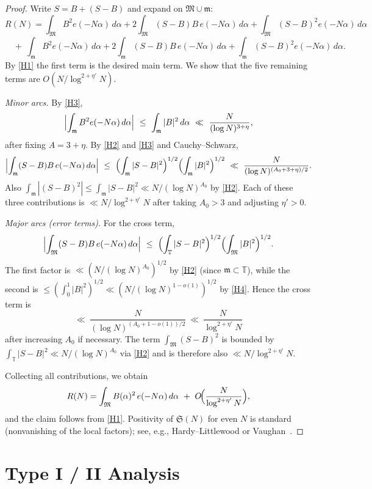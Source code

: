 \documentclass[11pt]{article}
\theoremstyle{definition}
\theoremstyle{remark}
\numberwithin{equation}{part}
\begin{document}
\begin{proof}
	Write $S=B+(S-B)$ and expand on $\mathfrak M\cup\mathfrak m$:
	\[
		R(N)=\int_{\mathfrak M} B^2 e(-N\alpha)\,d\alpha
		+ 2\!\int_{\mathfrak M} (S-B)B\,e(-N\alpha)\,d\alpha
		+ \int_{\mathfrak M} (S-B)^2 e(-N\alpha)\,d\alpha
	\]
	\[
		\quad +\ \int_{\mathfrak m} B^2 e(-N\alpha)\,d\alpha
		+ 2\!\int_{\mathfrak m} (S-B)B\,e(-N\alpha)\,d\alpha
		+ \int_{\mathfrak m} (S-B)^2 e(-N\alpha)\,d\alpha.
	\]
	By \ref{H1} the first term is the desired main term. We show that the five remaining terms are $O(N/\log^{2+\eta'}N)$.

	\emph{Minor arcs.} By \ref{H3},
	\[
		\Bigl|\int_{\mathfrak m} B^2 e(-N\alpha)\,d\alpha\Bigr|
		\ \le\ \int_{\mathfrak m}|B|^2\,d\alpha
		\ \ll\ \frac{N}{(\log N)^{3+\eta}},
	\]
	after fixing $A=3+\eta$.
	By \ref{H2} and \ref{H3} and Cauchy--Schwarz,
	\[
		\Bigl|\int_{\mathfrak m} (S-B)B\,e(-N\alpha)\,d\alpha\Bigr|
		\ \le\ \Bigl(\int_{\mathfrak m}|S-B|^2\Bigr)^{1/2}
		\Bigl(\int_{\mathfrak m}|B|^2\Bigr)^{1/2}
		\ \ll\ \frac{N}{(\log N)^{(A_0+3+\eta)/2}}.
	\]
	Also $\int_{\mathfrak m}|(S-B)^2| \le \int_{\mathfrak m}|S-B|^2 \ll N/(\log N)^{A_0}$ by \ref{H2}. Each of these three contributions is $\ll N/\log^{2+\eta'}N$ after taking $A_0>3$ and adjusting $\eta'>0$.

	\emph{Major arcs (error terms).} For the cross term,
	\[
		\Bigl|\int_{\mathfrak M} (S-B)B\,e(-N\alpha)\,d\alpha\Bigr|
		\ \le\ \Bigl(\int_{\mathbb T}|S-B|^2\Bigr)^{1/2}
		\Bigl(\int_{\mathfrak M}|B|^2\Bigr)^{1/2}.
	\]
	The first factor is $\ll (N/(\log N)^{A_0})^{1/2}$ by \ref{H2} (since $\mathfrak m\subset\mathbb T$), while the second is $\le (\int_0^1|B|^2)^{1/2}\ll (N/(\log N)^{1-o(1)})^{1/2}$ by \ref{H4}. Hence the cross term is
	\[
		\ll\ \frac{N}{(\log N)^{(A_0+1-o(1))/2}}
		\ \ll\ \frac{N}{\log^{2+\eta'}N}
	\]
	after increasing $A_0$ if necessary. The term $\int_{\mathfrak M}(S-B)^2$ is bounded by $\int_{\mathbb T}|S-B|^2\ll N/(\log N)^{A_0}$ via \ref{H2} and is therefore also $\ll N/\log^{2+\eta'}N$.

	Collecting all contributions, we obtain
	\[
		R(N)=\int_{\mathfrak M} B(\alpha)^2\,e(-N\alpha)\,d\alpha\ +\ O\!\Bigl(\frac{N}{\log^{2+\eta'}N}\Bigr),
	\]
	and the claim follows from \ref{H1}. Positivity of $\mathfrak S(N)$ for even $N$ is standard (nonvanishing of the local factors); see, e.g., Hardy--Littlewood or Vaughan~\cite[\S3.6]{VaughanHL}.
\end{proof}


\part{Type I / II Analysis}
\end{document}
